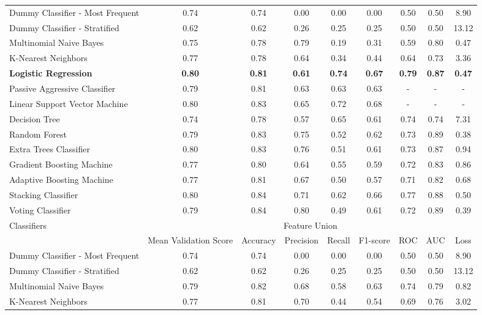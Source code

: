 \documentclass[Royal,sageapa,times]{sagej}
\begin{document}
\begin{landscape}
\begin{longtable}[l]{lcccccccc}
    Dummy Classifier - Most   Frequent & 0.74 & 0.74 & 0.00 & 0.00 & 0.00 & 0.50 & 0.50 & 8.90 \\
    Dummy Classifier - Stratified & 0.62 & 0.62 & 0.26 & 0.25 & 0.25 & 0.50 & 0.50 & 13.12 \\
    Multinomial Naive Bayes & 0.75 & 0.78 & 0.79 & 0.19 & 0.31 & 0.59 & 0.80 & 0.47 \\
    K-Nearest Neighbors & 0.77 & 0.78 & 0.64 & 0.34 & 0.44 & 0.64 & 0.73 & 3.36 \\
    \textbf{Logistic Regression} & \textbf{0.80} & \textbf{0.81} & \textbf{0.61} & \textbf{0.74} & \textbf{0.67} & \textbf{0.79} & \textbf{0.87} & \textbf{0.47} \\
    Passive Aggressive Classifier & 0.79 & 0.81 & 0.63 & 0.63 & 0.63 & - & - & - \\
    Linear Support Vector Machine & 0.80 & 0.83 & 0.65 & 0.72 & 0.68 & - & - & - \\
    Decision Tree & 0.74 & 0.78 & 0.57 & 0.65 & 0.61 & 0.74 & 0.74 & 7.31 \\
    Random Forest & 0.79 & 0.83 & 0.75 & 0.52 & 0.62 & 0.73 & 0.89 & 0.38 \\
    Extra Trees Classifier & 0.80 & 0.83 & 0.76 & 0.51 & 0.61 & 0.73 & 0.87 & 0.94 \\
    Gradient Boosting Machine & 0.77 & 0.80 & 0.64 & 0.55 & 0.59 & 0.72 & 0.83 & 0.86 \\
    Adaptive Boosting Machine & 0.77 & 0.81 & 0.67 & 0.50 & 0.57 & 0.71 & 0.82 & 0.68 \\
    Stacking Classifier & 0.80 & 0.84 & 0.71 & 0.62 & 0.66 & 0.77 & 0.88 & 0.50 \\
    Voting Classifier & 0.79 & 0.84 & 0.80 & 0.49 & 0.61 & 0.72 & 0.89 & 0.39 \\ \hline
    \multirow{2}{*}{Classifiers} & \multicolumn{8}{c}{Feature Union} \\ \cline{2-9}
    & Mean   Validation Score & Accuracy & Precision & Recall & F1-score & ROC & AUC & Loss \\ \hline
    Dummy Classifier - Most   Frequent & 0.74 & 0.74 & 0.00 & 0.00 & 0.00 & 0.50 & 0.50 & 8.90 \\
    Dummy Classifier - Stratified & 0.62 & 0.62 & 0.26 & 0.25 & 0.25 & 0.50 & 0.50 & 13.12 \\
    Multinomial Naive Bayes & 0.79 & 0.82 & 0.68 & 0.58 & 0.63 & 0.74 & 0.79 & 0.82 \\
    K-Nearest Neighbors & 0.77 & 0.81 & 0.70 & 0.44 & 0.54 & 0.69 & 0.76 & 3.02 \\

\end{longtable}
\end{landscape}
\end{document}
